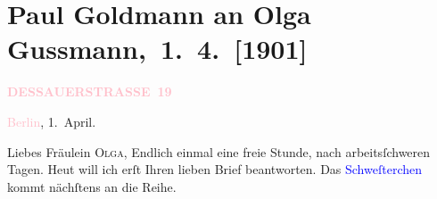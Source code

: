 

\renewcommand{\erwaehntePersonen}{Personen: Peter Cornelius, Paul Goldmann, Paul Marx, Olga Schnitzler, Elisabeth Steinrück}
\renewcommand{\erwaehnteOrte}{Orte: Berlin, Dessauer Straße, Wien}
\renewcommand{\erwaehnteWerke}{Werke: Brautlieder}
\section[ Paul Goldmann an Olga Gussmann, 1. 4. {[}1901{]}]{Paul Goldmann an Olga Gussmann, 1. 4. {[}1901{]}}
\nopagebreak{}
\rehead{ }\normalsize\beginnumbering{}
\toendnotes[C]{\smallbreak\pagebreak[2]}
\toendnotes[C]{\smallbreak}
\pstart
           \noindent{}\raggedleft{}{\pb}\textcolor{gray}{\textbf{\textcolor{pink}{DESSAUERSTRASSE 19}{}\ledrightnote{\textcolor{pink}{Dessauer Straße}}}}\pend
           
\pstart
           \textcolor{pink}{Berlin}{}\ledrightnote{\textcolor{pink}{Berlin}}, 1. April.\pend
           
\pstart\center{}Liebes Fräulein \textsc{Olga},\pend
\pstart
           Endlich einmal eine freie Stunde, nach arbeitsſchweren Tagen. Heut will ich erſt Ihren lieben Brief beantworten. Das \textcolor{blue}{Schweſterchen}{}\ledrightnote{{$\rightarrow$}\textcolor{blue}{Elisabeth Steinrück}} kommt nächſtens an die
               Reihe.\pend
           
